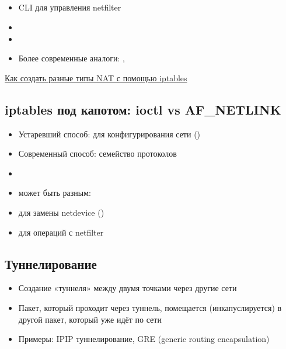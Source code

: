   \subsection{}
    \begin{itemize}
      \item CLI для управления netfilter
      \item {}
      \item {}
      \item Более современные аналоги: , 
    \end{itemize}
    \href{https://stackoverflow.com/questions/11719572/how-to-simulate-different-nat-behaviours}{Как создать разные типы NAT с помощью iptables}
  
  \subsection{iptables под капотом: ioctl vs AF\_NETLINK}
    \begin{itemize}
      \item Устаревший способ:  для конфигурирования сети ()
      \item Современный способ: семейство протоколов 
      \item {}
      \item {} может быть разным:
      \item {} для замены netdevice ()
      \item {} для операций с netfilter
    \end{itemize}
  
  \subsection{Туннелирование}
    \begin{itemize}
      \item Создание «туннеля» между двумя точками через другие сети
      \item Пакет, который проходит через туннель, помещается (инкапуслируется) в другой пакет, который уже идёт по сети
      \item Примеры: IPIP туннелирование, GRE (generic routing encapsulation)
    \end{itemize}
  

